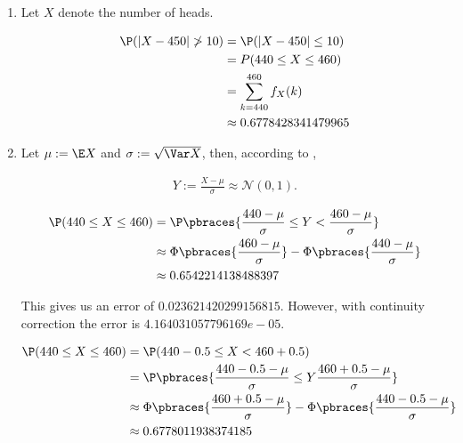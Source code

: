 \begin{solution}

\phantom{}

\begin{enumerate}[label = (\alph*)]

    \item Let $X$ denote the number of heads.
    
    \begin{align*}
        \P(|X - 450| \not > 10)
        & =
        \P(|X - 450| \leq 10) \\
        & =
        P(440 \leq X \leq 460) \\
        & =
        \sum_{k=440}^{460} f_X(k) \\
        & \approx
        0.6778428341479965
    \end{align*}

    \item Let $\mu := \E X$ and $\sigma := \sqrt{\Var X}$, then, according to \cite[Lecture 4, Slide 69]{EStat},
    
    \begin{align*}
        Y := \frac{X - \mu}{\sigma} \approx \mathcal N(0, 1).
    \end{align*}

    \begin{align*}
        \P(440 \leq X \leq 460)
        & =
        \P \pbraces{\frac{440 - \mu}{\sigma} \leq Y < \frac{460 - \mu}{\sigma}} \\
        & \approx
        \Phi \pbraces{\frac{460 - \mu}{\sigma}} - \Phi \pbraces{\frac{440 - \mu}{\sigma}} \\
        & \approx
        0.6542214138488397
    \end{align*}

    This gives us an error of $0.023621420299156815$.
    However, with continuity correction the error is $4.164031057796169e-05$.

    \begin{align*}
        \P(440 \leq X \leq 460)
        & =
        \P(440 - 0.5 \leq X < 460 + 0.5) \\
        & =
        \P \pbraces{\frac{440 - 0.5 - \mu}{\sigma} \leq Y \frac{460 + 0.5 - \mu}{\sigma}} \\
        & \approx
        \Phi \pbraces{\frac{460 + 0.5 - \mu}{\sigma}} - \Phi \pbraces{\frac{440 - 0.5 - \mu}{\sigma}} \\
        & \approx
        0.6778011938374185
    \end{align*}

\end{enumerate}

\end{solution}

